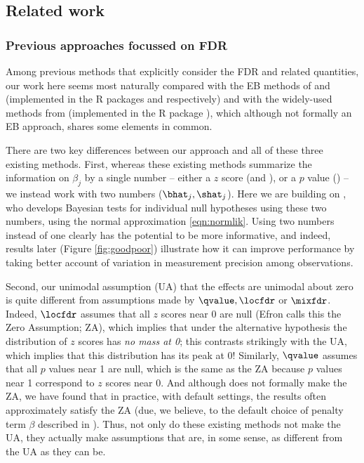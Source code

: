 \subsection*{Related work}

\subsubsection*{Previous approaches focussed on FDR}

Among previous methods that explicitly consider the FDR and related quantities,
our work here seems most naturally compared with the EB methods of \cite{efron2008microarrays} and \cite{muralidharan2010empirical}
 (implemented in the R packages \locfdr and \mixfdr respectively) and with the widely-used methods from  \cite{storey.03} (implemented in the R package \qvalue), which although not formally an EB approach, shares some elements in common.

There are two key differences between our approach and all of these three existing methods. First, 
whereas these existing methods summarize the information on $\beta_j$ by a single number -- either a $z$ score (\locfdr and \mixfdr), or a $p$ value (\qvalue) -- 
we instead work with two numbers ($\bhat_j,\shat_j$). Here we are building on \cite{wakefield:2009}, who develops Bayesian tests 
for individual null hypotheses using these two numbers, using the normal approximation \ref{eqn:normlik}.
Using two numbers instead of one clearly has the potential to be more informative, and indeed, results later (Figure \ref{fig:goodpoor}) illustrate 
how it can improve performance by taking better account of variation in measurement precision among observations.

Second, our unimodal assumption (UA) that the effects are unimodal about zero is quite different from assumptions made by $\qvalue, \locfdr$ or $\mixfdr$.
Indeed, $\locfdr$ assumes that all $z$ scores near 0 are null (Efron calls this the Zero Assumption; ZA), which implies that 
under the alternative hypothesis the distribution of $z$ scores has {\it no mass at 0}; this contrasts strikingly with the UA, which implies that this distribution has its peak at 0! 
Similarly, $\qvalue$ assumes that all $p$ values near 1 are null,
which is the same as the ZA because $p$ values near 1 correspond to $z$ scores near 0. And although \mixfdr does not formally make the ZA,
we have found that in practice, with default settings, the results often approximately satisfy the ZA (due, we believe, to the default choice of penalty term $\beta$ described in \cite{muralidharan2010empirical}). Thus, not only do these existing methods not make the UA, they actually make assumptions that are, in some sense, as different
from the UA as they can be.

